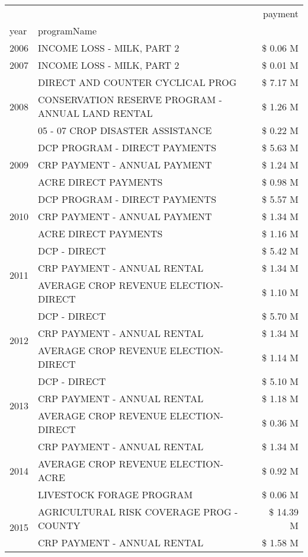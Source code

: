 \begin{tabular}{llr}
\toprule
 &  & payment \\
year & programName &  \\
\midrule
2006 & INCOME LOSS - MILK, PART 2 & \$ 0.06 M \\
\cline{1-3}
2007 & INCOME LOSS - MILK, PART 2 & \$ 0.01 M \\
\cline{1-3}
\multirow[t]{3}{*}{2008} & DIRECT AND COUNTER CYCLICAL PROG & \$ 7.17 M \\
 & CONSERVATION RESERVE PROGRAM - ANNUAL LAND RENTAL & \$ 1.26 M \\
 & 05 - 07 CROP DISASTER ASSISTANCE & \$ 0.22 M \\
\cline{1-3}
\multirow[t]{3}{*}{2009} & DCP PROGRAM - DIRECT PAYMENTS & \$ 5.63 M \\
 & CRP PAYMENT - ANNUAL PAYMENT & \$ 1.24 M \\
 & ACRE DIRECT PAYMENTS & \$ 0.98 M \\
\cline{1-3}
\multirow[t]{3}{*}{2010} & DCP PROGRAM - DIRECT PAYMENTS & \$ 5.57 M \\
 & CRP PAYMENT - ANNUAL PAYMENT & \$ 1.34 M \\
 & ACRE DIRECT PAYMENTS & \$ 1.16 M \\
\cline{1-3}
\multirow[t]{3}{*}{2011} & DCP - DIRECT & \$ 5.42 M \\
 & CRP PAYMENT - ANNUAL RENTAL & \$ 1.34 M \\
 & AVERAGE CROP REVENUE ELECTION-DIRECT & \$ 1.10 M \\
\cline{1-3}
\multirow[t]{3}{*}{2012} & DCP - DIRECT & \$ 5.70 M \\
 & CRP PAYMENT - ANNUAL RENTAL & \$ 1.34 M \\
 & AVERAGE CROP REVENUE ELECTION-DIRECT & \$ 1.14 M \\
\cline{1-3}
\multirow[t]{3}{*}{2013} & DCP - DIRECT & \$ 5.10 M \\
 & CRP PAYMENT - ANNUAL RENTAL & \$ 1.18 M \\
 & AVERAGE CROP REVENUE ELECTION-DIRECT & \$ 0.36 M \\
\cline{1-3}
\multirow[t]{3}{*}{2014} & CRP PAYMENT - ANNUAL RENTAL & \$ 1.34 M \\
 & AVERAGE CROP REVENUE ELECTION-ACRE & \$ 0.92 M \\
 & LIVESTOCK FORAGE PROGRAM & \$ 0.06 M \\
\cline{1-3}
\multirow[t]{3}{*}{2015} & AGRICULTURAL RISK COVERAGE PROG - COUNTY & \$ 14.39 M \\
 & CRP PAYMENT - ANNUAL RENTAL & \$ 1.58 M \\

\end{tabular}
